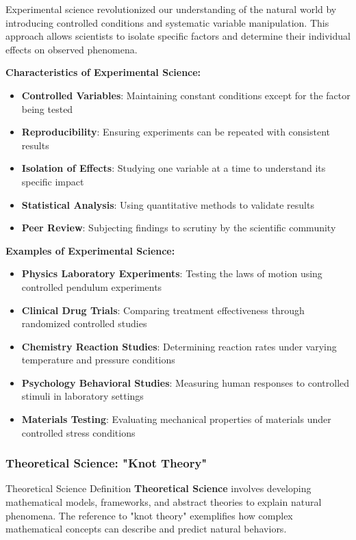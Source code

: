 Experimental science revolutionized our understanding of the natural world by introducing controlled conditions and systematic variable manipulation. This approach allows scientists to isolate specific factors and determine their individual effects on observed phenomena.

\textbf{Characteristics of Experimental Science:}
\begin{itemize}
    \item \textbf{Controlled Variables}: Maintaining constant conditions except for the factor being tested
    \item \textbf{Reproducibility}: Ensuring experiments can be repeated with consistent results
    \item \textbf{Isolation of Effects}: Studying one variable at a time to understand its specific impact
    \item \textbf{Statistical Analysis}: Using quantitative methods to validate results
    \item \textbf{Peer Review}: Subjecting findings to scrutiny by the scientific community
\end{itemize}

\textbf{Examples of Experimental Science:}
\begin{itemize}
    \item \textbf{Physics Laboratory Experiments}: Testing the laws of motion using controlled pendulum experiments
    \item \textbf{Clinical Drug Trials}: Comparing treatment effectiveness through randomized controlled studies
    \item \textbf{Chemistry Reaction Studies}: Determining reaction rates under varying temperature and pressure conditions
    \item \textbf{Psychology Behavioral Studies}: Measuring human responses to controlled stimuli in laboratory settings
    \item \textbf{Materials Testing}: Evaluating mechanical properties of materials under controlled stress conditions
\end{itemize}

\subsubsection{Theoretical Science: "Knot Theory"}

\begin{conceptcard}{Theoretical Science Definition}
\textbf{Theoretical Science} involves developing mathematical models, frameworks, and abstract theories to explain natural phenomena. The reference to "knot theory" exemplifies how complex mathematical concepts can describe and predict natural behaviors.
\end{conceptcard}

